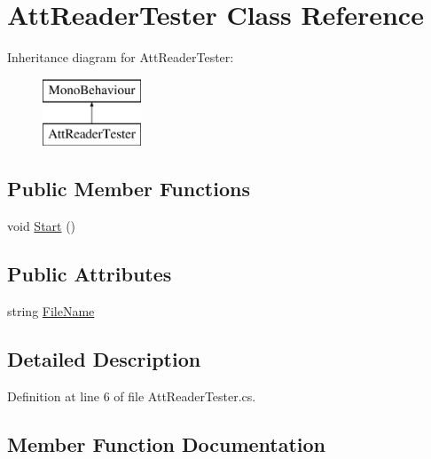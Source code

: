 \hypertarget{class_att_reader_tester}{}\section{Att\+Reader\+Tester Class Reference}
\label{class_att_reader_tester}
Inheritance diagram for Att\+Reader\+Tester\+:\begin{figure}[H]
\begin{center}
\leavevmode
\includegraphics[height=2.000000cm]{class_att_reader_tester}
\end{center}
\end{figure}
\subsection*{Public Member Functions}
\begin{DoxyCompactItemize}
\item 
void \mbox{\hyperlink{class_att_reader_tester_a7c15935d9ac7ec723d4cf79b8dd980d3}{Start}} ()
\end{DoxyCompactItemize}
\subsection*{Public Attributes}
\begin{DoxyCompactItemize}
\item 
string \mbox{\hyperlink{class_att_reader_tester_af5a4b71fdccabe095f1715251960a13f}{File\+Name}}
\end{DoxyCompactItemize}


\subsection{Detailed Description}


Definition at line 6 of file Att\+Reader\+Tester.\+cs.



\subsection{Member Function Documentation}
\mbox{\label{class_att_reader_tester_a7c15935d9ac7ec723d4cf79b8dd980d3}} 
